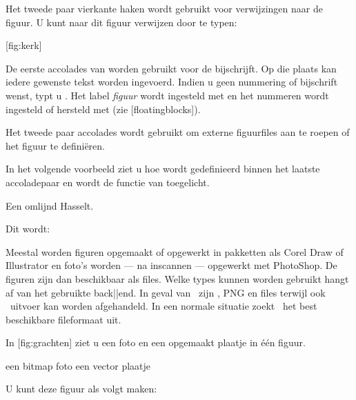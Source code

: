 Het tweede paar vierkante haken wordt gebruikt voor
verwijzingen naar de figuur. U kunt naar dit figuur
verwijzen door te typen:

\starttypen
{}[fig:kerk]
\stoptypen

De eerste accolades van \type{\plaatsfiguur} worden gebruikt
voor de bijschrijft. Op die plaats kan iedere gewenste tekst
worden ingevoerd. Indien u geen nummering of bijschrift
wenst, typt u . Het label {\em figuur} wordt
ingesteld met \type{\stelblokkopjesin} en het nummeren wordt
ingesteld of hersteld met \type{\stelnummerenin} (zie
[floatingblocks]).

Het tweede paar accolades wordt gebruikt om externe
figuurfiles aan te roepen of het figuur te defini\"eren.

In het volgende voorbeeld ziet u hoe
 wordt gedefinieerd binnen het
laatste accoladepaar en wordt de functie van
\type{\plaatsfiguur{}{}} toegelicht.

\startbuffer
\plaatsfiguur
  {Een omlijnd Hasselt.}
  {}

\stopbuffer

\typebuffer

Dit wordt:

\haalbuffer

Meestal worden figuren opgemaakt of opgewerkt in pakketten
als Corel Draw of Illustrator en foto's worden --- na inscannen
--- opgewerkt met PhotoShop. De figuren zijn dan beschikbaar als
files. Welke types kunnen worden gebruikt hangt af van het
gebruikte back||end. In geval van \PDFTEX\ zijn , \type
{PNG} en  files terwijl ook \METAPOST\ uitvoer kan
worden afgehandeld. In een normale situatie zoekt \CONTEXT\ het
best beschikbare fileformaat uit.

In [fig:grachten] ziet u een foto en een
opgemaakt plaatje in \'e\'en figuur.

\startbuffer
{}
  {\startcombinatie[2*1]
     {\externfiguur[ma-cb-03][breedte=.4\tekstbreedte]}
        {een bitmap foto}
     {\externfiguur[ma-cb-00][width=.4\tekstbreedte]}
        {een vector plaatje}
   \stopcombinatie}
\stopbuffer

\haalbuffer

U kunt deze figuur als volgt maken:

\typebuffer

